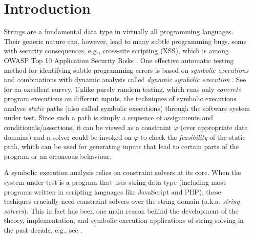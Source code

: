 
\section{Introduction}
\label{sec:intro}

Strings are a fundamental data type in virtually all programming languages.
Their generic nature can, however, lead to many subtle programming 
bugs, some with security consequences, e.g., cross-site scripting
(XSS), which is among OWASP Top 10 Application Security Risks
\cite{owasp17}. One effective
automatic testing method for identifying subtle programming errors
is based on \emph{symbolic executions} 
\cite{king76} and combinations with dynamic analysis
called \emph{dynamic symbolic execution} \cite{jalangi,DART,EXE,CUTE,KLEE}.
See \cite{symbex-survey} for an excellent survey. Unlike purely random testing,
which runs only \emph{concrete} program executions on different 
inputs, the techniques of symbolic executions analyse \emph{static} paths
(also called symbolic executions) through the software system under test.
Since such a path is simply a sequence of assignments and
conditionals/assertions, it can be viewed as a constraint $\varphi$ (over 
appropriate data domains) and a 
solver could be invoked on $\varphi$ to check the \emph{feasibility}
of the static path, which can be used for generating inputs that lead to 
certain parts of the program or an erroneous behaviour.

A symbolic execution analysis relies on constraint solvers at its core. When 
the system
under test is a program that uses string data type (including most programs 
written in scripting languages like JavaScript and PHP), these techiques 
crucially need constraint solvers over the string domain (a.k.a. \emph{string 
solvers}). This in fact has been one main reason behind the development of
the theory, implementation, and symbolic execution applications of string 
solving in the past decade, e.g., see 
\cite{BTV09,Berkeley-JavaScript,HAMPI,Stranger,Vijay-length,YABI14,Abdulla14,LB16,fang-yu-circuits,Abdulla17,CCHLW18,HJLRV18,S3,TCJ16,Z3-str,Z3-str2,cvc4,Saner,RVG12,jalangi,expose}.

